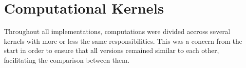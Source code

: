 \documentclass[main.tex]{subfiles}
\begin{document}
\section{Computational Kernels} \label{section:kernels}

Throughout all implementations, computations were divided accross several kernels with more or less the same responsibilities. This was a concern from the start in order to ensure that all versions remained similar to each other, facilitating the comparison between them.

\end{document}
